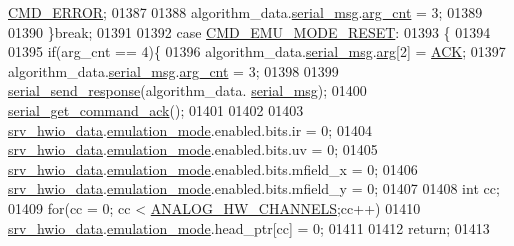\begin{DoxyCode}
{{{{{      \hyperlink{a00021_a1764a522e9c1a59a59be8757c69fa494}{CMD\_ERROR};
01387 
01388                              algorithm\_data.\hyperlink{a00016_afcf5f557aea688aad985eec15269c1da}{serial\_msg}.\hyperlink{a00031_a7b79f40e2eeec288091afd340bf8f591}{arg\_cnt} = 3;
01389 
01390                 \}\textcolor{keywordflow}{break};
01391 
01392                  \textcolor{keywordflow}{case}  \hyperlink{a00021_a48532ee6ce8c4c41bc6a972f66998ca6}{CMD\_EMU\_MODE\_RESET}:
01393                 \{
01394 
01395                         \textcolor{keywordflow}{if}(arg\_cnt == 4)\{
01396                         algorithm\_data.\hyperlink{a00016_afcf5f557aea688aad985eec15269c1da}{serial\_msg}.\hyperlink{a00031_af7d6f762438c80072bd9dc0e4dd4ae1e}{arg}[2] = \hyperlink{a00021_a6f6489887e08bff4887d0bc5dcf214d8}{ACK};
01397                         algorithm\_data.\hyperlink{a00016_afcf5f557aea688aad985eec15269c1da}{serial\_msg}.\hyperlink{a00031_a7b79f40e2eeec288091afd340bf8f591}{arg\_cnt} = 3;
01398 
01399                         \hyperlink{a00031_a96a3f016ca5b0736424c2695fe9fbdf8}{serial\_send\_response}(algorithm\_data.
      \hyperlink{a00016_afcf5f557aea688aad985eec15269c1da}{serial\_msg});
01400                         \hyperlink{a00031_a7fc7421ed15d6e4516e9878e7455d715}{serial\_get\_command\_ack}();
01401 
01402 
01403                         \hyperlink{a00034_a0fd91014631926f362c7c2b2f5d143b0}{srv\_hwio\_data}.\hyperlink{a00034_a742dceaef1f19ec73ed5acc066127476}{emulation\_mode}.enabled.bits.ir       = 0;
01404                         \hyperlink{a00034_a0fd91014631926f362c7c2b2f5d143b0}{srv\_hwio\_data}.\hyperlink{a00034_a742dceaef1f19ec73ed5acc066127476}{emulation\_mode}.enabled.bits.uv       = 0;
01405                         \hyperlink{a00034_a0fd91014631926f362c7c2b2f5d143b0}{srv\_hwio\_data}.\hyperlink{a00034_a742dceaef1f19ec73ed5acc066127476}{emulation\_mode}.enabled.bits.mfield\_x = 0;
01406                         \hyperlink{a00034_a0fd91014631926f362c7c2b2f5d143b0}{srv\_hwio\_data}.\hyperlink{a00034_a742dceaef1f19ec73ed5acc066127476}{emulation\_mode}.enabled.bits.mfield\_y = 0;
01407 
01408                         \textcolor{keywordtype}{int} cc;
01409                           \textcolor{keywordflow}{for}(cc = 0; cc < \hyperlink{a00034_ab6ea71f43c4869429695d697be882efe}{ANALOG\_HW\_CHANNELS};cc++)
01410                           \hyperlink{a00034_a0fd91014631926f362c7c2b2f5d143b0}{srv\_hwio\_data}.\hyperlink{a00034_a742dceaef1f19ec73ed5acc066127476}{emulation\_mode}.head\_ptr[cc] = 0;
01411 
01412                         \textcolor{keywordflow}{return};
01413                            
}}}}}
\end{DoxyCode}
